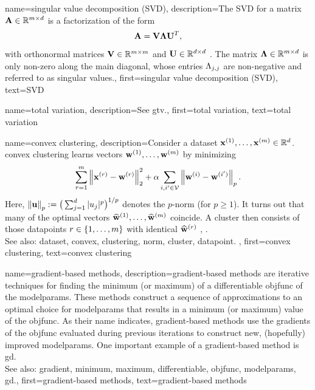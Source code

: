 {name={singular value decomposition (SVD)}, 
  	description={The SVD  
  		for a matrix ${\bf A} \in \mathbb{R}^{m \times d}$ 
		is a factorization of the form 
		$${\bf A} = \mathbf{V} {\bm \Lambda} \mathbf{U}^{T},$$ 
		with orthonormal matrices $\mathbf{V} \in \mathbb{R}^{m \times m}$ 
		and $\mathbf{U} \in \mathbb{R}^{d \times d}$ \cite{GolubVanLoanBook}. 
		The matrix ${\bm \Lambda} \in \mathbb{R}^{m \times d}$ is 
		only non-zero along the main diagonal, whose entries $\Lambda_{j,j}$ 
		are non-negative and referred to as singular values.},
	first={singular value decomposition (SVD)},
	text={SVD} 
}


{name={total variation}, 
	description={See \gls{gtv}.},
	first={total variation},
	text={total variation} 
}


 {name={convex clustering}, 
 	description={Consider a \gls{dataset} 
 		${\bf x}^{(1)},\ldots,{\bf x}^{(m)} \in \mathbb{R}^{d}$. 
 		\Gls{convex} \gls{clustering} learns vectors ${\bf w}^{(1)},\ldots,{\bf w}^{(m)}$ by minimizing 
 		$$ \sum_{r=1}^{m} \left\Vert {{\bf x}^{(r)} - {\bf w}^{(r)}} \right\Vert_{2}^2 + 
 		\alpha \sum_{i,i' \in \mathcal{V}} \left\Vert {{\bf w}^{(i)} - {\bf w}^{(i')}} \right\Vert_{p}.$$ 
		Here, $ \left\Vert {{\bf u}} \right\Vert_{p} := \big( \sum_{j=1}^{d} |u_{j}|^{p} \big)^{1/p}$ 
		denotes the $p$-\gls{norm} (for $p\geq1$).  
		It turns out that many of the optimal vectors $\widehat{{\bf w}}^{(1)},\ldots,\widehat{{\bf w}}^{(m)}$ 
		coincide. A \gls{cluster} then consists of those \glspl{datapoint} $r \in \{1,\ldots,m\}$ 
		with identical $\widehat{{\bf w}}^{(r)}$ \cite{JMLR:v22:18-694}, \cite{Pelckmans2005}. 
			\\
		See also: \gls{dataset}, \gls{convex}, \gls{clustering}, \gls{norm}, \gls{cluster}, \gls{datapoint}. },
 	first={convex clustering},
	text={convex clustering} 
}


{name={gradient-based methods}, 
	description={\Gls{gradient}-based 
		methods are iterative techniques for finding the \gls{minimum} (or \gls{maximum}) 
		of a \gls{differentiable} \gls{objfunc} of the \gls{modelparams}. These 
		methods construct a sequence of approximations to an optimal choice for 
		\gls{modelparams} that results in a \gls{minimum} (or \gls{maximum}) value of the \gls{objfunc}. 
		As their name indicates, \gls{gradient}-based methods use the \glspl{gradient} of the \gls{objfunc} 
		evaluated during previous iterations to construct new, (hopefully) improved \gls{modelparams}. 
		One important example of a \gls{gradient}-based method is \gls{gd}.
				\\
		See also: \gls{gradient}, \gls{minimum}, \gls{maximum}, \gls{differentiable}, \gls{objfunc}, \gls{modelparams}, \gls{gd}.},
	first={gradient-based methods},
	text={gradient-based methods} 
}


